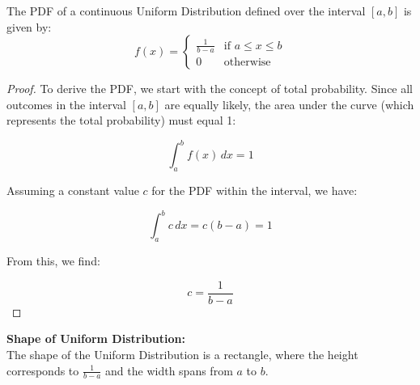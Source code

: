 \begin{definition}
    The PDF of a continuous Uniform Distribution defined over the interval \([a, b]\) is given by:
\[
f(x) = \begin{cases} 
\frac{1}{b - a} & \text{if } a \leq x \leq b \\
0 & \text{otherwise}
\end{cases}
\]
\end{definition}

\begin{proof}
    To derive the PDF, we start with the concept of total probability. Since all outcomes in the interval \([a, b]\) are equally likely, the area under the curve (which represents the total probability) must equal 1:

\[
\int_{a}^{b} f(x) \, dx = 1
\]

Assuming a constant value \( c \) for the PDF within the interval, we have:

\[
\int_{a}^{b} c \, dx = c(b - a) = 1
\]

From this, we find:

\[
c = \frac{1}{b - a}
\]

\end{proof}

\textbf{Shape of Uniform Distribution:} \\

The shape of the Uniform Distribution is a rectangle, where the height corresponds to \( \frac{1}{b - a} \) and the width spans from \( a \) to \( b \).

\begin{center}
    \end{center}


